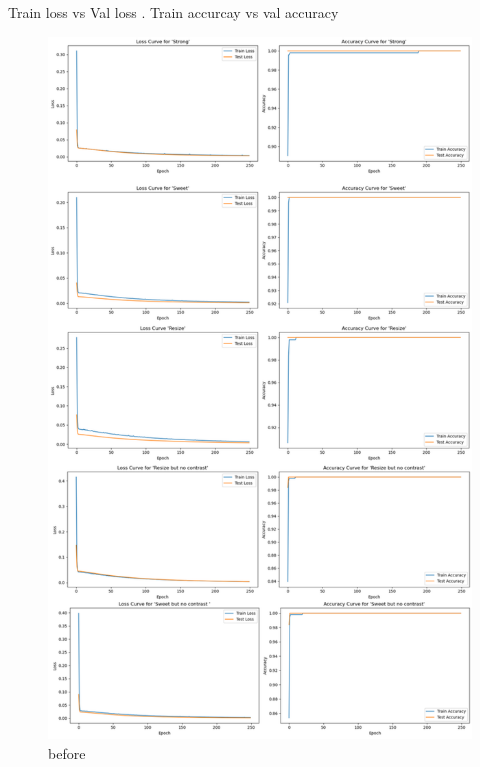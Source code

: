 Train loss vs Val loss . Train accurcay  vs val accuracy 
          

          \begin{figure}[H]
            \centering
            \includegraphics[scale=0.95]{figures/before.pdf} 
            \caption{before}
            \label{fig:before}
          \end{figure}

